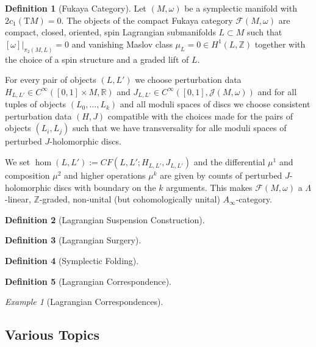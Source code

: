 \documentclass[a4paper]{article}
\newcommand{\RR}{\mathbb{R}}
\newcommand{\ZZ}{\mathbb{Z}}
\newcommand{\mcF}{\mathcal F}
\newcommand{\mcJ}{\mathcal J}
\newcommand{\cin}{C^{\infty}}
\newcommand{\ts}{\mathrm{T}}
\theoremstyle{definition}
\theoremstyle{definition}
\newtheorem{definition}{Definition}
\theoremstyle{remark}
\theoremstyle{remark}
\theoremstyle{remark}
\newtheorem{ex}{Example}
\begin{document}
\begin{definition}[Fukaya Category]
  Let $(M,\omega)$ be a symplectic manifold with $2c_1(\ts M)=0$. The objects of the compact Fukaya category $\mcF(M,\omega)$ are compact, closed, oriented, spin Lagrangian submanifolds $L\subset M$ such that $[\omega]|_{\pi_2(M,L)}=0$ and vanishing Maslov class $\mu_L=0\in H^1(L,\ZZ)$ together with the choice of a spin structure and a graded lift of $L$.

For every pair of objects $(L,L')$ we choose perturbation data $H_{L,L'}\in\cin([0,1]\times M,\RR)$ and $J_{L,L'}\in\cin([0,1],\mcJ(M,\omega))$ and for all tuples of objects $(L_0,\ldots,L_k)$ and all moduli spaces of discs we choose consistent perturbation data $(H,J)$ compatible with the choices made for the pairs of objects $(L_i,L_j)$ such that we have transversality for alle moduli spaces of perturbed $J$-holomorphic discs.

We set $\hom(L,L'):=CF(L,L';H_{L,L'},J_{L,L'})$ and the differential $\mu^1$ and composition $\mu^2$ and higher operations $\mu^k$ are given by counts of perturbed $J$-holomorphic discs with boundary on the $k$ arguments. This makes $\mcF(M,\omega)$ a $\Lambda$-linear, $\ZZ$-graded, non-unital (but cohomologically unital) $A_{\infty}$-category.
\end{definition}

\begin{definition}[Lagrangian Suspension Construction]
  
\end{definition}

\begin{definition}[Lagrangian Surgery]
  
\end{definition}

\begin{definition}[Symplectic Folding]
  
\end{definition}

\begin{definition}[Lagrangian Correspondence]
  
\end{definition}

\begin{ex}[Lagrangian Correspondences]
  
\end{ex}

\subsection{Various Topics}
\end{document}
